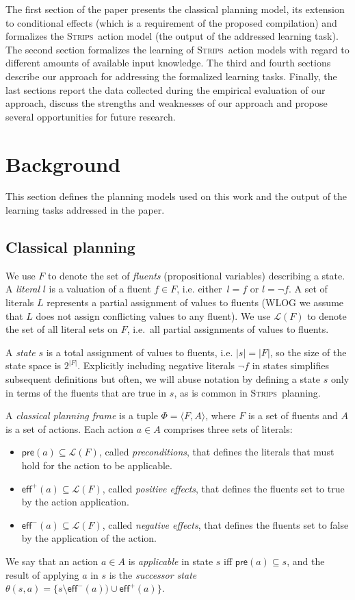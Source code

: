 \documentclass[letterpaper]{article} %
\newcommand{\tup}[1]{{\langle #1 \rangle}}
\newcommand{\pre}{\mathsf{pre}}     %
\newcommand{\eff}{\mathsf{eff}}     %
\newcommand{\strips}{\textsc{Strips}}     %
\begin{document}
The first section of the paper presents the classical planning model, its extension to conditional effects (which is a requirement of the proposed compilation) and formalizes the \strips\ action model (the output of the addressed learning task). The second section formalizes the learning of \strips\ action models with regard to different amounts of available input knowledge. The third and fourth sections describe our approach for addressing the formalized learning tasks. Finally, the last sections report the data collected during the empirical evaluation of our approach, discuss the strengths and weaknesses of our approach and propose several opportunities for future research.


\section{Background}
This section defines the planning models used on this work and the output of the learning tasks addressed in the paper.

\subsection{Classical planning}
We use $F$ to denote the set of {\em fluents} (propositional variables) describing a state. A {\em literal} $l$ is a valuation of a fluent $f\in F$, i.e. either~$l=f$ or $l=\neg f$. A set of literals $L$ represents a partial assignment of values to fluents (WLOG we assume that $L$ does not assign conflicting values to any fluent). We use $\mathcal{L}(F)$ to denote the set of all literal sets on $F$, i.e.~all partial assignments of values to fluents.

A {\em state} $s$ is a total assignment of values to fluents, i.e. $|s|=|F|$, so the size of the state space is $2^{|F|}$. Explicitly including negative literals $\neg f$ in states simplifies subsequent definitions but often, we will abuse notation by defining a state $s$ only in terms of the fluents that are true in $s$, as is common in \strips\ planning.

A {\em classical planning frame} is a tuple $\Phi=\tup{F,A}$, where $F$ is a set of fluents and $A$ is a set of actions. Each action $a\in A$ comprises three sets of literals:
\begin{itemize}
\item $\pre(a)\subseteq\mathcal{L}(F)$, called {\em preconditions}, that defines the literals that must hold for the action to be applicable.
\item $\eff^+(a)\subseteq\mathcal{L}(F)$, called {\em positive effects}, that defines the fluents set to true by the action application.
\item $\eff^-(a)\subseteq\mathcal{L}(F)$, called {\em negative effects}, that defines the fluents set to false by the application of the action. 
\end{itemize}
We say that an action $a\in A$ is {\em applicable} in state $s$ iff $\pre(a)\subseteq s$, and the result of applying $a$ in $s$ is the {\em successor state} $\theta(s,a)=\{s\setminus\eff^-(a))\cup\eff^+(a)\}$.
\end{document}
